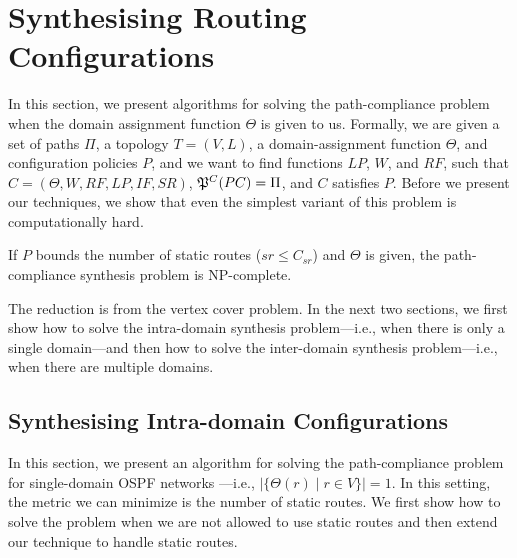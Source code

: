 \section{Synthesising Routing Configurations}
\label{sec:config-synthesis}

In this section, we present algorithms for 
solving the path-compliance problem when the domain
assignment function $\Theta$ is given to us.
Formally, we are given a set of paths $\Pi$,
a topology $T=(V,L)$,
a domain-assignment function $\Theta$, 
and configuration policies $P$,
and we want to find functions
$LP$, $W$, and $RF$,  such that
$C=(\Theta,W,RF,LP,IF,SR)$,
$\mathfrak{P}^C(PC) = \Pi$, and
$C$ satisfies $P$.
Before we present our techniques,
we  show that
even the simplest variant of this problem is computationally hard.
\begin{theorem}
\label{thm:ospfsynth}
If $P$ bounds the number of static routes ($sr\leq C_{sr}$) and $\Theta$ is given, the path-compliance synthesis
problem is NP-complete.
\end{theorem}
\iffull

\else
The reduction is from the vertex cover problem.
\fi
In the next two sections, we first show how to solve the intra-domain synthesis problem---i.e., when there
is only a single domain---and then how to solve the inter-domain synthesis problem---i.e., when
there are multiple domains.

\subsection{Synthesising Intra-domain Configurations} \label{sec:intra-synthesis}
In this section, we present an algorithm for 
solving the path-compliance problem for 
single-domain OSPF networks
---i.e., $|\{\Theta(r) \mid r\in V\}|=1$.
In this setting, the metric we can minimize is the number of static routes.
We first show how to solve the problem when
we are not allowed to use static routes
and then
extend our technique to handle static routes.

